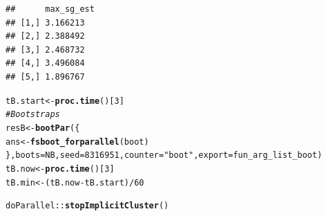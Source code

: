 \documentclass[12pt]{article}
\makeatletter
\newcommand{\hlnum}[1]{\textcolor[rgb]{0.686,0.059,0.569}{#1}}%
\newcommand{\hlstr}[1]{\textcolor[rgb]{0.192,0.494,0.8}{#1}}%
\newcommand{\hlcom}[1]{\textcolor[rgb]{0.678,0.584,0.686}{\textit{#1}}}%
\newcommand{\hlopt}[1]{\textcolor[rgb]{0,0,0}{#1}}%
\newcommand{\hlstd}[1]{\textcolor[rgb]{0.345,0.345,0.345}{#1}}%
\newcommand{\hlkwb}[1]{\textcolor[rgb]{0.69,0.353,0.396}{#1}}%
\newcommand{\hlkwc}[1]{\textcolor[rgb]{0.333,0.667,0.333}{#1}}%
\newcommand{\hlkwd}[1]{\textcolor[rgb]{0.737,0.353,0.396}{\textbf{#1}}}%
\newenvironment{kframe}{%
 \def\at@end@of@kframe{}%
 \ifinner\ifhmode%
  \def\at@end@of@kframe{\end{minipage}}%
  \begin{minipage}{\columnwidth}%
 \fi\fi%
 \def\FrameCommand##1{\hskip\@totalleftmargin \hskip-\fboxsep
 \colorbox{shadecolor}{##1}\hskip-\fboxsep
     \hskip-\linewidth \hskip-\@totalleftmargin \hskip\columnwidth}%
 \MakeFramed {\advance\hsize-\width
   \@totalleftmargin\z@ \linewidth\hsize
   \@setminipage}}%
 {\par\unskip\endMakeFramed%
 \at@end@of@kframe}
\newenvironment{knitrout}{}{} %
\makeatother
\begin{document}
\begin{knitrout}
\begin{kframe}
\begin{verbatim}
##      max_sg_est
## [1,] 3.166213  
## [2,] 2.388492  
## [3,] 2.468732  
## [4,] 3.496084  
## [5,] 1.896767
\end{verbatim}
\begin{alltt}
\hlstd{tB.start} \hlkwb{<-} \hlkwd{proc.time}\hlstd{()[}\hlnum{3}\hlstd{]}
\hlcom{# Bootstraps}
\hlstd{resB} \hlkwb{<-} \hlkwd{bootPar}\hlstd{(\{}
    \hlstd{ans} \hlkwb{<-} \hlkwd{fsboot_forparallel}\hlstd{(boot)}
\hlstd{\},} \hlkwc{boots} \hlstd{= NB,} \hlkwc{seed} \hlstd{=} \hlnum{8316951}\hlstd{,} \hlkwc{counter} \hlstd{=} \hlstr{"boot"}\hlstd{,} \hlkwc{export} \hlstd{= fun_arg_list_boot)}
\hlstd{tB.now} \hlkwb{<-} \hlkwd{proc.time}\hlstd{()[}\hlnum{3}\hlstd{]}
\hlstd{tB.min} \hlkwb{<-} \hlstd{(tB.now} \hlopt{-} \hlstd{tB.start)}\hlopt{/}\hlnum{60}

\hlstd{doParallel}\hlopt{::}\hlkwd{stopImplicitCluster}\hlstd{()}


\end{alltt}
\end{kframe}
\end{knitrout}
\end{document}
